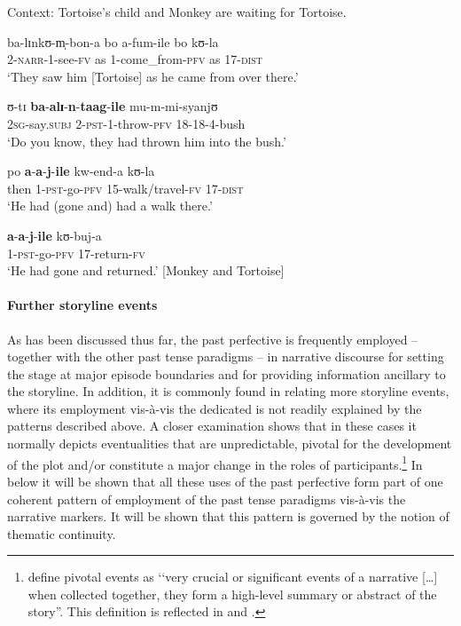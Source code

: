 \begin{exe}
\ex Context: Tortoise's child and Monkey are waiting for Tortoise.
\begin{xlist}
\ex \gll ba-lɪnkʊ-m̩-bon-a bo a-fum-ile bo kʊ-la\\
2-\textsc{narr}-1-see-\textsc{fv} as 1-come\_from-\textsc{pfv} as 17-\textsc{dist}\\
\glt \lq They saw him [Tortoise] as he came from over there.' 

\ex \gll ʊ-tɪ \textbf{ba}-\textbf{alɪ}-\textbf{n}-\textbf{taag}-\textbf{ile} mu-m-mi-syanjʊ\\
\textsc{2sg}-say.\textsc{subj} 2-\textsc{pst}-1-throw-\textsc{pfv} 18-18-4-bush\\
\glt \lq Do you know, they had thrown him into the bush.'

\ex \gll po \textbf{a}-\textbf{a}-\textbf{j}-\textbf{ile} kw-end-a kʊ-la\\
then 1-\textsc{pst}-go-\textsc{pfv} 15-walk/travel-\textsc{fv} 17-\textsc{dist}\\
\glt \lq He had (gone and) had a walk there.'

\ex \gll \textbf{a}-\textbf{a}-\textbf{j}-\textbf{ile} kʊ-buj-a\\
1-\textsc{pst}-go-\textsc{pfv} 17-return-\textsc{fv}\\
\glt \lq He had gone and returned.' [Monkey and Tortoise]
\end{xlist}
\end{exe}

\paragraph{Further storyline events} \label{PastPFVNarrativeDiscourseOtherDiscontinuities}
As has been discussed thus far, the past perfective is frequently employed -- together with the other past tense paradigms -- in narrative discourse for setting the stage at major episode boundaries and for providing information ancillary to the storyline. In addition, it is commonly found in relating more storyline events, where its employment vis-à-vis the dedicated  is not readily explained by the patterns described above. A closer examination shows that in these cases it normally depicts eventualities that are unpredictable, pivotal for the development of the plot and/or constitute a major change in the roles of participants.\footnote{\citet[8]{JonesLBJonesLK1979} define pivotal events as \lq\lq very crucial or significant events of a narrative [\ldots] when collected together, they form a high-level summary or abstract of the story''. This definition is reflected in \citet[90]{TomlinR1985} and \citet[5]{LongacreR1990}.} In  below it will be shown that all these uses of the past perfective form part of one coherent pattern of employment of the past tense paradigms vis-à-vis the narrative markers. It will be shown that this pattern is governed by the notion of thematic continuity.

